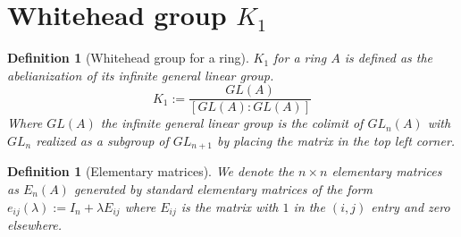 \documentclass[12pt]{article}
\numberwithin{equation}{section}
\newcounter{dummy} \numberwithin{dummy}{section}
\newtheorem{definition}[dummy]{Definition}
\begin{document}
	
	\section{Whitehead group $K_1$}
	\begin{definition}[Whitehead group for a ring] $K_1$ for a ring $A$ is defined as the abelianization of its infinite general linear group.
		$$K_1:= \frac{GL(A)}{[GL(A):GL(A)]}$$
		Where $GL(A)$ the infinite general linear group is the colimit of $GL_n(A)$ with $GL_{n}$ realized as a subgroup of $GL_{n+1}$ by placing the matrix in the top left corner. 
	\end{definition}

	\begin{definition}[Elementary matrices]
		We denote the $n\times n$ elementary matrices as $E_n(A)$ generated by standard elementary matrices of the form $e_{ij}(\lambda) := I_{n}+ \lambda E_{ij} $ where $E_{ij}$ is the matrix with $1$ in the $(i,j)$ entry and zero elsewhere.
	\end{definition}
	
\end{document}

